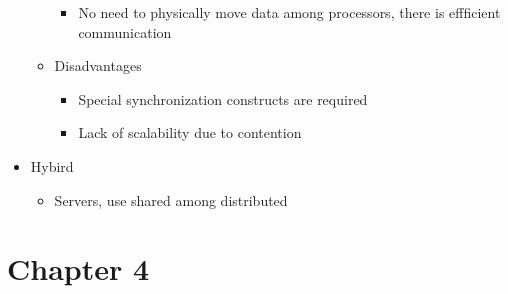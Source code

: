 \documentclass{article}
\begin{document}
\begin{itemize}
\begin{itemize}
\begin{itemize}
                        \item No need to physically move data among processors, there is effficient communication
                    \end{itemize}
              \item Disadvantages
                    \begin{itemize}
                        \item Special synchronization constructs are required
                        \item Lack of scalability due to contention
                    \end{itemize}
          \end{itemize}
    \item Hybird
          \begin{itemize}
              \item Servers, use shared among distributed
          \end{itemize}
\end{itemize}

\section{Chapter 4}
\end{document}
